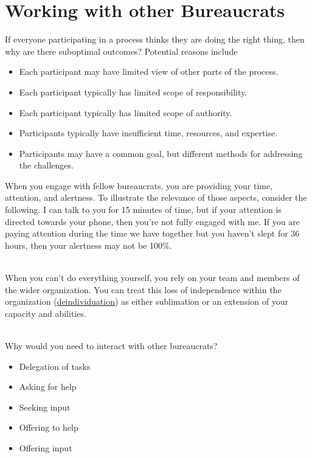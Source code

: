 \chapter{Working with other Bureaucrats\label{sec:working-with-other-bureaucrats}}


If everyone participating in a process thinks they are doing the right thing, then why are there suboptimal outcomes? Potential reasons include
\begin{itemize}
    \item Each participant may have limited view of other parts of the process.
    \item Each participant typically has limited scope of responsibility.
    \item Each participant typically has limited scope of authority.
    \item Participants typically have insufficient time, resources, and expertise.
    \item Participants may have a common goal, but different methods for addressing the challenges.
\end{itemize}


When you engage with fellow bureaucrats, you are providing your time, attention, and alertness. To illustrate the relevance of those aspects, consider the following. I can talk to you for 15 minutes of time, but if your attention is directed towards your phone, then you're not fully engaged with me. If you are paying attention during the time we have together but you haven't slept for 36 hours, then your alertness may not be 100\%. 

\ \\

When you can't do everything yourself, you rely on your team and members of the wider organization. You can treat this loss of independence within the organization (\href{https://en.wikipedia.org/wiki/Deindividuation}{deindividuation}) as either sublimation or an extension of your capacity and abilities.

\ \\

Why would you need to interact with other bureaucrats?
\begin{itemize}
    \item Delegation of tasks
    \item Asking for help
    \item Seeking input
    \item Offering to help
    \item Offering input
\end{itemize}

